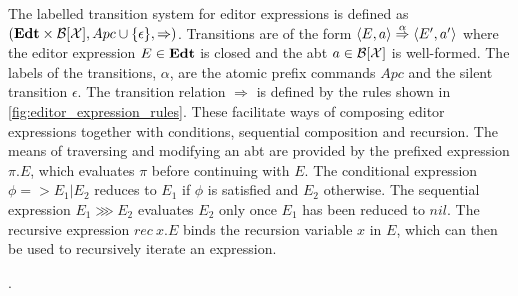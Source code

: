\documentclass[sigplan,anonymous,review]{acmart}
\begin{document}
The labelled transition system for editor expressions is defined as
$(\textbf{Edt} \times \mathcal{B}[\mathcal{X} ], Apc \cup \{\epsilon\},
\Rightarrow)$. Transitions are of the form $\langle E, a \rangle \stackrel{\alpha}{\Rightarrow}
\langle E', a' \rangle$ where the editor expression $E \in \textbf{Edt}$ is closed and
the abt $a \in \mathcal{B}[\mathcal{X} ]$ is well-formed. The labels of the transitions,
$\alpha$, are the atomic prefix commands $Apc$ and the silent
transition $\epsilon$. The transition relation $\Rightarrow$ is
defined by the rules shown in
\cref{fig:editor_expression_rules}. These facilitate ways of composing
editor expressions together with conditions, sequential composition
and recursion. The means of traversing and modifying an abt are
provided by the prefixed expression $\pi.E$, which evaluates $\pi$
before continuing with $E$. The conditional expression $\phi =>
E_1|E_2$ reduces to $E_1$ if $\phi$ is satisfied and $E_2$
otherwise. The sequential expression $E_1 \ggg E_2$ evaluates $E_2$
only once $E_1$ has been reduced to $nil$. The recursive expression
$rec \ x.E$ binds the recursion variable $x$ in $E$, which can then be
used to recursively iterate an expression. 

.
\end{document}
